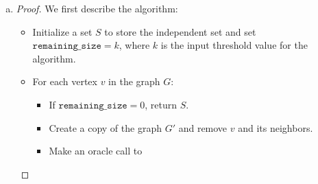 \documentclass[11pt]{scrartcl}
\theoremstyle{dotlessP}
\theoremstyle{dotlessN}
\begin{document}
\begin{enumerate}[(a)]
\begin{proof}
\begin{itemize}
			\item We will prove that the reduction algorithm is correct. Initially, $\texttt{left} = 1$ and $\texttt{right} = n$, as the size of an independent set is at least 1 and cannot be greater than the amount of vertices in $G$. The algorithm then enters a loop that performs binary search for the largest independent set size. The loop invariant is that $\texttt{left} < \texttt{right}$, and the loop will exit when $\texttt{left} = \texttt{right}$. From the loop invariant, with each iteration, we make an oracle call to \texttt{IndependentSet-ThresholdSearch} with inputs $G$ and $\texttt{mid}$, which is the average value in the current range from $\texttt{left}$ to \texttt{right}. If the oracle returns a set, then it follows that there exists an independent set that is of size $\texttt{mid}$ or greater, and thus we can shift our range to  \texttt{mid} to \texttt{right}. If the oracle returns $\perp$, then it follows that there does not exist an independent set that is at least size $\texttt{mid}$, and thus we can shift our range to \texttt{left} to \texttt{mid}. We repeat until we exit the loop. At this point, there does not exist an independent set of size greater than $\texttt{left} = \texttt{right}$, or an independent set of size less than $\texttt{left} = \texttt{right}$, which means that the set obtained when $\texttt{left} = \texttt{right}$ is the largest size for an independent set in $G$.
		\end{itemize}
		We have shown that the reduction algorithm is correct and runs at $O((\log n) \cdot T(n,m))$.
	\end{proof}
\item 
	\begin{proof}
		We first describe the algorithm:
		\begin{itemize}
			\item Initialize a set $S$ to store the independent set and set $\texttt{remaining\_size} = k$, where $k$ is the input threshold value for the algorithm. 
			\item For each vertex $v$ in the graph $G$:
				\begin{itemize}
					\item If $\texttt{remaining\_size} = 0$, return $S$.
					\item Create a copy of the graph $G'$ and remove $v$ and its neighbors. 
					\item Make an oracle call to 


\end{itemize}
\end{itemize}
\end{proof}
\end{enumerate}
\end{document}
